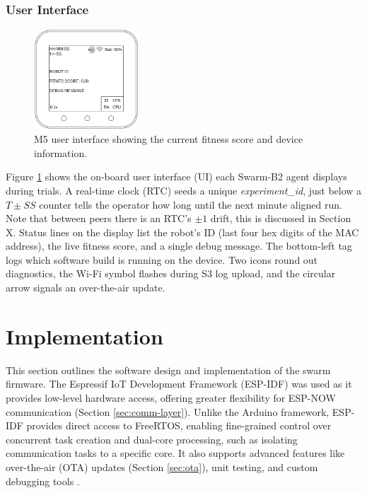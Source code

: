 \documentclass[conference]{IEEEtran}
\begin{document}

\subsubsection{User Interface}

\begin{figure}[h]
    \centering
    \includegraphics[width=0.35\textwidth]{UI.png}
    \caption{M5 user interface showing the current fitness score and device information.}
    \label{fig:UI}
\end{figure}

Figure \ref{fig:UI} shows the on-board user interface (UI) each Swarm-B2 agent displays during trials. A real-time clock (RTC) seeds a unique \emph{experiment\_id}, just below a $T\pm SS$ counter tells the operator how long until the next minute aligned run. Note that between peers there is an RTC's $\pm1$ drift, this is discussed in Section X. Status lines on the display list the robot's ID (last four hex digits of the MAC address), the live fitness score, and a single debug message. The bottom-left tag logs which software build is running on the device. Two icons round out diagnostics, the Wi-Fi symbol flashes during S3 log upload, and the circular arrow signals an over-the-air update.

\section{Implementation}

This section outlines the software design and implementation of the swarm firmware. The Espressif IoT Development Framework (ESP-IDF) was used as it provides low-level hardware access, offering greater flexibility for ESP-NOW communication (Section \ref{sec:comm-layer}). Unlike the Arduino framework, ESP-IDF provides direct access to FreeRTOS, enabling fine-grained control over concurrent task creation and dual-core processing, such as isolating communication tasks to a specific core. It also supports advanced features like over-the-air (OTA) updates (Section \ref{sec:ota}), unit testing, and custom debugging tools \cite{esp-boards_esp-idf_nodate}.
\end{document}

